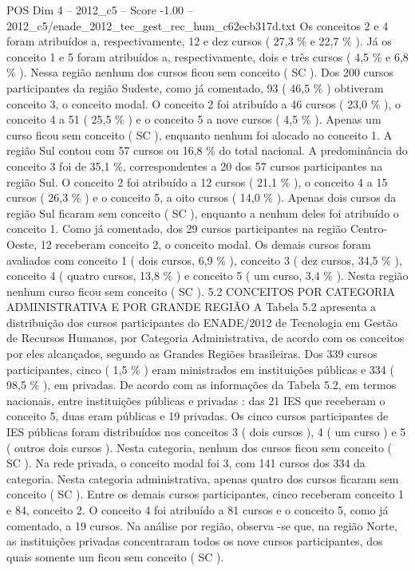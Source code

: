 \begin{textsample}{POS Dim 4 – 2012\_c5 – Score -1.00 – 2012\_c5/enade\_2012\_tec\_gest\_rec\_hum\_c62ecb317d.txt}
Os conceitos 2 e 4 foram atribuídos a, respectivamente, 12 e dez cursos ( 27,3 \% e 22,7 \% ).
Já os conceito 1 e 5 foram atribuídos a, respectivamente, dois e três cursos ( 4,5 \% e 6,8 \% ).
Nessa região nenhum dos cursos ficou sem conceito ( SC ).
Dos 200 cursos participantes da região Sudeste, como já comentado, 93 ( 46,5 \% ) obtiveram conceito 3, o conceito modal.
O conceito 2 foi atribuído a 46 cursos ( 23,0 \% ), o conceito 4 a 51 ( 25,5 \% ) e o conceito 5 a nove cursos ( 4,5 \% ).
Apenas um curso ficou sem conceito ( SC ), enquanto nenhum foi alocado ao conceito 1.
A região Sul contou com 57 cursos ou 16,8 \% do total nacional.
A predominância do conceito 3 foi de 35,1 \%, correspondentes a 20 dos 57 cursos participantes na região Sul.
O conceito 2 foi atribuído a 12 cursos ( 21,1 \% ), o conceito 4 a 15 cursos ( 26,3 \% ) e o conceito 5, a oito cursos ( 14,0 \% ).
Apenas dois cursos da região Sul ficaram sem conceito ( SC ), enquanto a nenhum deles foi atribuído o conceito 1.
Como já comentado, dos 29 cursos participantes na região Centro-Oeste, 12 receberam conceito 2, o conceito modal.
Os demais cursos foram avaliados com conceito 1 ( dois cursos, 6,9 \% ), conceito 3 ( dez cursos, 34,5 \% ), conceito 4 ( quatro cursos, 13,8 \% ) e conceito 5 ( um curso, 3,4 \% ).
Nesta região nenhum curso ficou sem conceito ( SC ). 5.2 CONCEITOS POR CATEGORIA ADMINISTRATIVA E POR GRANDE REGIÃO A Tabela 5.2 apresenta a distribuição dos cursos participantes do ENADE/2012 de Tecnologia em Gestão de Recursos Humanos, por Categoria Administrativa, de acordo com os conceitos por eles alcançados, segundo as Grandes Regiões brasileiras.
Dos 339 cursos participantes, cinco ( 1,5 \% ) eram ministrados em instituições públicas e 334 ( 98,5 \% ), em privadas.
De acordo com as informações da Tabela 5.2, em termos nacionais, entre instituições públicas e privadas : das 21 IES que receberam o conceito 5, duas eram públicas e 19 privadas.
Os cinco cursos participantes de IES públicas foram distribuídos nos conceitos 3 ( dois cursos ), 4 ( um curso ) e 5 ( outros dois cursos ).
Nesta categoria, nenhum dos cursos ficou sem conceito ( SC ).
Na rede privada, o conceito modal foi 3, com 141 cursos dos 334 da categoria.
Nesta categoria administrativa, apenas quatro dos cursos ficaram sem conceito ( SC ).
Entre os demais cursos participantes, cinco receberam conceito 1 e 84, conceito 2.
O conceito 4 foi atribuído a 81 cursos e o conceito 5, como já comentado, a 19 cursos.
Na análise por região, observa -se que, na região Norte, as instituições privadas concentraram todos os nove cursos participantes, dos quais somente um ficou sem conceito ( SC ).

\end{textsample}
